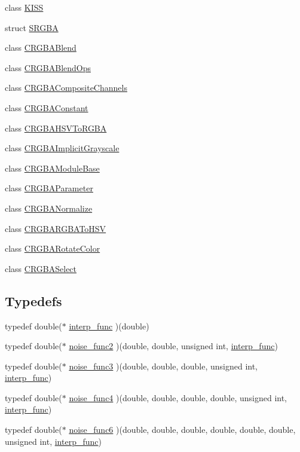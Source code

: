 \begin{DoxyCompactItemize}
class \hyperlink{classanl_1_1KISS}{KISS}
\item 
struct \hyperlink{structanl_1_1SRGBA}{SRGBA}
\item 
class \hyperlink{classanl_1_1CRGBABlend}{CRGBABlend}
\item 
class \hyperlink{classanl_1_1CRGBABlendOps}{CRGBABlendOps}
\item 
class \hyperlink{classanl_1_1CRGBACompositeChannels}{CRGBACompositeChannels}
\item 
class \hyperlink{classanl_1_1CRGBAConstant}{CRGBAConstant}
\item 
class \hyperlink{classanl_1_1CRGBAHSVToRGBA}{CRGBAHSVToRGBA}
\item 
class \hyperlink{classanl_1_1CRGBAImplicitGrayscale}{CRGBAImplicitGrayscale}
\item 
class \hyperlink{classanl_1_1CRGBAModuleBase}{CRGBAModuleBase}
\item 
class \hyperlink{classanl_1_1CRGBAParameter}{CRGBAParameter}
\item 
class \hyperlink{classanl_1_1CRGBANormalize}{CRGBANormalize}
\item 
class \hyperlink{classanl_1_1CRGBARGBAToHSV}{CRGBARGBAToHSV}
\item 
class \hyperlink{classanl_1_1CRGBARotateColor}{CRGBARotateColor}
\item 
class \hyperlink{classanl_1_1CRGBASelect}{CRGBASelect}
\end{DoxyCompactItemize}
\subsection*{Typedefs}
\begin{DoxyCompactItemize}
\item 
typedef double($\ast$ \hyperlink{namespaceanl_a2c8cd5d25499b47ef49c82dea75ba8dd}{interp\_\-func} )(double)
\item 
typedef double($\ast$ \hyperlink{namespaceanl_afde4e91ea2a8d75a93c4abe8c7eacd83}{noise\_\-func2} )(double, double, unsigned int, \hyperlink{namespaceanl_a2c8cd5d25499b47ef49c82dea75ba8dd}{interp\_\-func})
\item 
typedef double($\ast$ \hyperlink{namespaceanl_a92b0e78f6459c949d2f7b08a91b843e5}{noise\_\-func3} )(double, double, double, unsigned int, \hyperlink{namespaceanl_a2c8cd5d25499b47ef49c82dea75ba8dd}{interp\_\-func})
\item 
typedef double($\ast$ \hyperlink{namespaceanl_a3482023bba3cc79a7a5e569d38aa7259}{noise\_\-func4} )(double, double, double, double, unsigned int, \hyperlink{namespaceanl_a2c8cd5d25499b47ef49c82dea75ba8dd}{interp\_\-func})
\item 
typedef double($\ast$ \hyperlink{namespaceanl_a7e1d1c8ad49ec7a95b33a1a75b6ffbcb}{noise\_\-func6} )(double, double, double, double, double, double, unsigned int, \hyperlink{namespaceanl_a2c8cd5d25499b47ef49c82dea75ba8dd}{interp\_\-func})
\end{DoxyCompactItemize}
